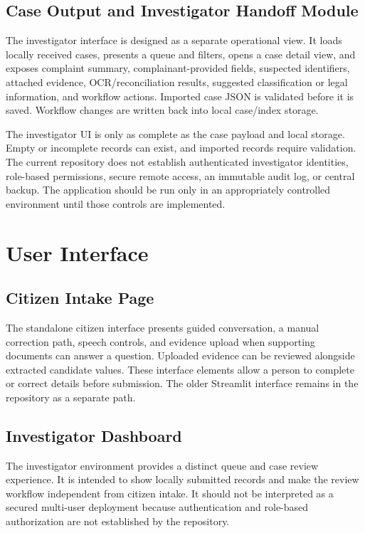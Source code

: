 \documentclass[12pt,a4paper,oneside]{report}
\begin{document}
\subsection{Case Output and Investigator Handoff Module}
The investigator interface is designed as a separate operational view. It loads locally received cases, presents a queue and filters, opens a case detail view, and exposes complaint summary, complainant-provided fields, suspected identifiers, attached evidence, OCR/reconciliation results, suggested classification or legal information, and workflow actions. Imported case JSON is validated before it is saved. Workflow changes are written back into local case/index storage.\par\medskip
The investigator UI is only as complete as the case payload and local storage. Empty or incomplete records can exist, and imported records require validation. The current repository does not establish authenticated investigator identities, role-based permissions, secure remote access, an immutable audit log, or central backup. The application should be run only in an appropriately controlled environment until those controls are implemented.\par\medskip
\section{User Interface}
\subsection{Citizen Intake Page}
The standalone citizen interface presents guided conversation, a manual correction path, speech controls, and evidence upload when supporting documents can answer a question. Uploaded evidence can be reviewed alongside extracted candidate values. These interface elements allow a person to complete or correct details before submission. The older Streamlit interface remains in the repository as a separate path.\par\medskip
\subsection{Investigator Dashboard}
The investigator environment provides a distinct queue and case review experience. It is intended to show locally submitted records and make the review workflow independent from citizen intake. It should not be interpreted as a secured multi-user deployment because authentication and role-based authorization are not established by the repository.\par\medskip
\end{document}
